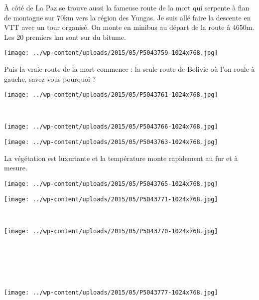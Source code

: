 À côté de La Paz se trouve aussi la fameuse route de la mort qui serpente à flan de montagne sur 70km vers la région des Yungas. Je suis allé faire la descente en VTT avec un tour organisé. On monte en minibus au départ de la route à 4650m. Les 20 premiers km sont sur du bitume. 
\begin{center} \texttt{[image: ../wp-content/uploads/2015/05/P5043759-1024x768.jpg]} \end{center}

Puis la vraie route de la mort commence : la seule route de Bolivie où l'on roule à gauche, savez-vous pourquoi ? 
\begin{center} \texttt{[image: ../wp-content/uploads/2015/05/P5043761-1024x768.jpg]} \end{center}
\vspace{-\topsep}
\pagebreak
~\\
\begin{center} \texttt{[image: ../wp-content/uploads/2015/05/P5043766-1024x768.jpg]} \end{center}
\begin{center} \texttt{[image: ../wp-content/uploads/2015/05/P5043763-1024x768.jpg]} \end{center}
\vspace{-\topsep}
\vspace{-3.25mm}
\pagebreak
La végétation est luxuriante et la température monte rapidement au fur et à mesure. 
\begin{center} \texttt{[image: ../wp-content/uploads/2015/05/P5043765-1024x768.jpg]} \end{center}
\begin{center} \texttt{[image: ../wp-content/uploads/2015/05/P5043771-1024x768.jpg]} \end{center}
\vspace{-\topsep}
\vspace{-3.25mm}
\pagebreak
~
\begin{center} \texttt{[image: ../wp-content/uploads/2015/05/P5043770-1024x768.jpg]} \end{center}
~\\~\\~\\
~\\
\begin{center} \texttt{[image: ../wp-content/uploads/2015/05/P5043777-1024x768.jpg]} \end{center}
\vspace{-\topsep}
\pagebreak

